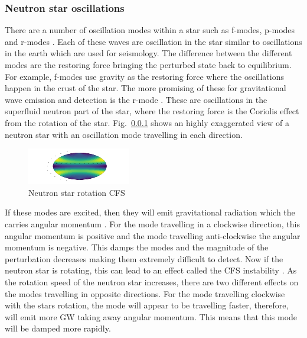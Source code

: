  \subsubsection{Neutron star oscillations}
There are a number of oscillation modes within a star such as f-modes, p-modes and r-modes \citep{becker2009NeutronStars}.
Each of these waves are oscillation in the star similar to oscillations in the earth which are used for seismology.
The difference between the different modes are the restoring force bringing the perturbed state back to equilibrium.
For example, f-modes use gravity as the restoring force where the oscillations happen in the crust of the star.
The more promising of these for gravitational wave emission and detection is the r-mode \citep{lasky2015GravitationalWaves}.
These are oscillations in the superfluid neutron part of the star, where the restoring force is the Coriolis effect from the rotation of the star.
Fig.~\ref{} shows an highly exaggerated view of a neutron star with an oscillation mode travelling in each direction.
\begin{figure}[h]
	\centering
	\includegraphics[width=\textwidth]{testimg.png}
	\caption{Neutron star rotation CFS}
	\label{intro:source:cw:rmode}
\end{figure}
If these modes are excited, then they will emit gravitational radiation which the carries angular momentum \citep{}. 
For the mode travelling in a clockwise direction, this angular momentum is positive and the mode travelling anti-clockwise the angular momentum is negative. 
This damps the modes and the magnitude of the perturbation decreases making them extremely difficult to detect.
Now if the neutron star is rotating, this can lead to an effect called the \ac{CFS} instability \citep{chanrasakar,Freidmann}. 
As the rotation speed of the neutron star increases, there are two different effects on the modes travelling in opposite directions. 
For the mode travelling clockwise with the stars rotation, the mode will appear to be travelling faster, therefore, will emit more \ac{GW} taking away angular momentum. This means that this mode will be damped more rapidly.
